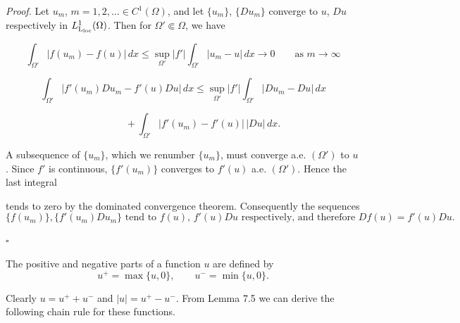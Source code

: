 \emph{Proof.} Let $u_m$, $m=1,2,\dots \in C^1(\Omega)$, and let $\{u_m\}$, $\{Du_m\}$ converge to $u$, $Du$ respectively in $L^1_{\operatorname{L_{\mathrm{loc}}}}(\Omega)$. Then for $\Omega' \Subset \Omega$, we have

\[
\int_{\Omega'} \lvert f(u_m)-f(u)\rvert\, dx \le \sup_{\Omega'} \lvert f'\rvert \int_{\Omega'} \lvert u_m-u\rvert\, dx \to 0 \qquad \text{as } m \to \infty
\]

\[
\int_{\Omega'} \lvert f'(u_m)Du_m-f'(u)Du\rvert\, dx \le \sup_{\Omega'} \lvert f'\rvert \int_{\Omega'} \lvert Du_m-Du\rvert\, dx
\]

\[
\qquad\qquad + \int_{\Omega'} \lvert f'(u_m)-f'(u)\rvert\, \lvert Du\rvert\, dx.
\]

A subsequence of $\{u_m\}$, which we renumber $\{u_m\}$, must converge a.e. $(\Omega')$ to $u$.
Since $f'$ is continuous, $\{f'(u_m)\}$ converges to $f'(u)$ a.e. $(\Omega')$. Hence the last integral


tends to zero by the dominated convergence theorem. Consequently the sequences
\[
\{f(u_m)\}, \{f'(u_m)Du_m\} \text{ tend to } f(u),\, f'(u)Du \text{ respectively, and therefore } Df(u)=
f'(u)Du.
\]
\begin{center}
$\square$
\end{center}

The positive and negative parts of a function $u$ are defined by
\[
u^+=\max\{u,0\}, \qquad u^-=\min\{u,0\}.
\]

Clearly $u=u^++u^-$ and $|u|=u^+-u^-$. From Lemma 7.5 we can derive the following
chain rule for these functions.

